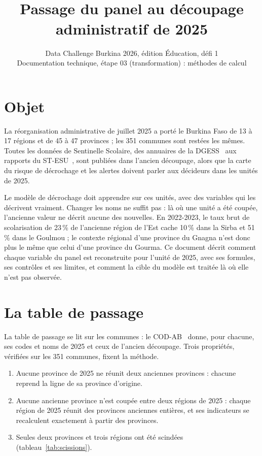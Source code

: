 \documentclass{article}
\title{\sol{}\\[3pt]
{\large\mdseries Passage du panel au découpage administratif de 2025}}
\author{
Data Challenge Burkina 2026, édition Éducation, défi 1\\
\affiliations
Documentation technique, étape 03 (transformation) : méthodes de calcul
}
\renewcommand{\tablename}{Tableau}%
\renewcommand{\figurename}{Figure}%
\renewcommand{\refname}{Références}%
\newcommand{\sol}{Sentinelle Scolaire}
\begin{document}
\renewcommand{\tablename}{Tableau}\renewcommand{\figurename}{Figure}\renewcommand{\refname}{Références}
\raggedbottom

\maketitle
\thispagestyle{plain}
\pagestyle{plain}

\section{Objet}

La réorganisation administrative de juillet 2025 a porté le Burkina Faso de 13 à 17 régions et de 45 à 47 provinces ; les 351 communes sont restées les mêmes. Toutes les données de \sol{}, des annuaires de la DGESS~\cite{dgess_annuaires} aux rapports du ST-ESU~\cite{stesu}, sont publiées dans l'ancien découpage, alors que la carte du risque de décrochage et les alertes doivent parler aux décideurs dans les unités de 2025.

Le modèle de décrochage doit apprendre sur ces unités, avec des variables qui les décrivent vraiment. Changer les noms ne suffit pas : là où une unité a été coupée, l'ancienne valeur ne décrit aucune des nouvelles. En 2022-2023, le taux brut de scolarisation de 23\,\% de l'ancienne région de l'Est cache 10\,\% dans la Sirba et 51\,\% dans le Goulmou ; le contexte régional d'une province du Gnagna n'est donc plus le même que celui d'une province du Gourma. Ce document décrit comment chaque variable du panel est reconstruite pour l'unité de 2025, avec ses formules, ses contrôles et ses limites, et comment la cible du modèle est traitée là où elle n'est pas observée.

\section{La table de passage}

La table de passage se lit sur les communes : le COD-AB~\cite{codab} donne, pour chacune, ses codes et noms de 2025 et ceux de l'ancien découpage. Trois propriétés, vérifiées sur les 351 communes, fixent la méthode.

\begin{enumerate}
\item Aucune province de 2025 ne réunit deux anciennes provinces : chacune reprend la ligne de sa province d'origine.
\item Aucune ancienne province n'est coupée entre deux régions de 2025 : chaque région de 2025 réunit des provinces anciennes entières, et ses indicateurs se recalculent exactement à partir des provinces.
\item Seules deux provinces et trois régions ont été scindées (tableau~\ref{tab:scissions}).
\end{enumerate}
\end{document}
